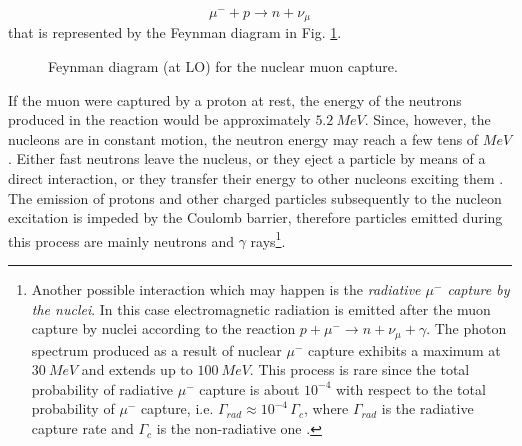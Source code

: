 \begin{equation}
	\mu^- + p   \rightarrow n + \nu_{\mu}
\end{equation}
that is represented by the Feynman diagram in Fig. \ref{buond muon decay}.


\begin{figure}[!h]
	\centering	
	
	
	\caption{Feynman diagram (at LO) for the nuclear muon capture.}\label{buond muon decay}
\end{figure}
\noindent If the muon were captured by a proton at rest, the energy of the neutrons produced in the reaction would be approximately $\SI{5.2}{MeV}$. Since, however, the nucleons are in constant motion, the neutron energy may reach a few tens of $\si{MeV}$. Either fast neutrons leave the nucleus, or they eject a particle by means of a direct interaction, or they transfer their energy to other nucleons exciting them \cite{Weissenberg}.
The emission of protons and other charged particles subsequently to the nucleon excitation is impeded by the Coulomb barrier, therefore particles emitted during this process are mainly neutrons and $\gamma$ rays\footnote{Another possible interaction which may happen is the \emph{radiative $\mu^-$ capture by the nuclei}. In this case electromagnetic radiation is emitted after the muon capture by nuclei according to the reaction
	$p + \mu^- \rightarrow n + \nu_{\mu} + \gamma$. The photon spectrum produced as a result of nuclear $\mu^-$ capture exhibits a maximum at $\SI{30}{MeV}$ and extends up to $\SI{100}{MeV}$.  
	This process is rare since the total probability of radiative $\mu^-$ capture is about $10^{-4}$ with respect to the total probability of $\mu^-$ capture, i.e.  $\Gamma_{rad} \approx 10^{-4} \, \Gamma_{c}$, 
	where $\Gamma_{rad}$ is the radiative capture rate and $\Gamma_{c}$ is the non-radiative one \cite{Weissenberg}.}\cite{Weissenberg}.\\

